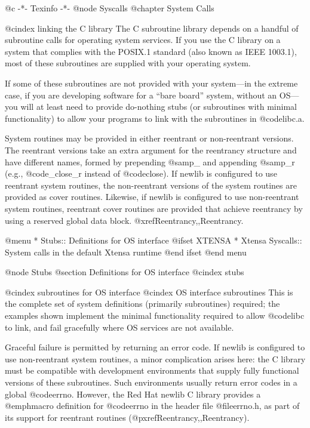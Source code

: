 @c                                           -*- Texinfo -*-
@node Syscalls
@chapter System Calls

@cindex linking the C library
The C subroutine library depends on a handful of subroutine calls for
operating system services.  If you use the C library on a system that
complies with the POSIX.1 standard (also known as IEEE 1003.1), most of
these subroutines are supplied with your operating system.

If some of these subroutines are not provided with your system---in
the extreme case, if you are developing software for a ``bare board''
system, without an OS---you will at least need to provide do-nothing
stubs (or subroutines with minimal functionality) to allow your
programs to link with the subroutines in @code{libc.a}.

System routines may be provided in either reentrant or non-reentrant
versions.  The reentrant versions take an extra argument for the
reentrancy structure and have different names, formed by prepending
@samp{_} and appending @samp{_r} (e.g., @code{_close_r} instead of
@code{close}).  If newlib is configured to use reentrant system
routines, the non-reentrant versions of the system routines are provided
as cover routines.  Likewise, if newlib is configured to use
non-reentrant system routines, reentrant cover routines are provided
that achieve reentrancy by using a reserved global data block.
@xref{Reentrancy,,Reentrancy}.

@menu
* Stubs::		Definitions for OS interface
@ifset XTENSA
* Xtensa Syscalls::     System calls in the default Xtensa runtime
@end ifset
@end menu

@node Stubs
@section Definitions for OS interface
@cindex stubs

@cindex subroutines for OS interface
@cindex OS interface subroutines
This is the complete set of system definitions (primarily subroutines)
required; the examples shown implement the minimal functionality
required to allow @code{libc} to link, and fail gracefully where OS
services are not available.  

Graceful failure is permitted by returning an error code.  If newlib is
configured to use non-reentrant system routines, a minor
complication arises here: the C library must be compatible with
development environments that supply fully functional versions of these
subroutines.  Such environments usually return error codes in a global
@code{errno}.  However, the Red Hat newlib C library provides a @emph{macro}
definition for @code{errno} in the header file @file{errno.h}, as part
of its support for reentrant routines (@pxref{Reentrancy,,Reentrancy}).

